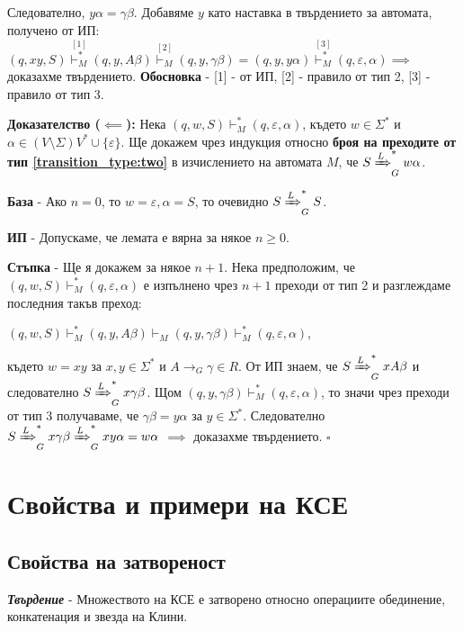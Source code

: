 \documentclass[fleqn,12pt]{article}
\begin{document}
Следователно, $y\alpha = \gamma \beta$. Добавяме $y$ като наставка в твърдението за автомата, получено от ИП:
$(q, xy, S) \overset{[1]}{\vdash_M^*} (q, y, A\beta) \overset{[2]}{\vdash_M} (q, y, \gamma\beta) = (q, y, y \alpha) \overset{[3]}{\vdash_M^*} (q, \varepsilon, \alpha)
\implies$ доказахме твърдението. \textbf{Обосновка} - [1] - от ИП, [2] - правило от тип 2, [3] - правило от тип 3. 

\noindent\textbf{Доказателство ($\impliedby$): } 
Нека $(q, w, S) \vdash_M^* (q, \varepsilon, \alpha)$, където $w \in \Sigma^*$ и $\alpha \in (V \setminus \Sigma)V^* \cup \{\varepsilon\}$.
Ще докажем чрез индукция относно \textbf{броя на преходите от тип \ref{transition_type:two}} в изчислението на автомата $M$, че $S \xRightarrow[]{L}_G^* w\alpha$.

\noindent\textbf{База} - Ако $n = 0$, то $w = \varepsilon, \alpha = S$, то очевидно $S \xRightarrow[]{L}_G^* S$.

\noindent\textbf{ИП} - Допускаме, че лемата е вярна за някое $n \geq 0$.

\noindent\textbf{Стъпка} - Ще я докажем за някое $n + 1$. Нека предположим, че $(q, w, S) \vdash_M^* (q, \varepsilon, \alpha)$ е изпълнено чрез $n+1$ преходи от тип 2 и разглеждаме последния такъв преход:

$(q, w, S) \vdash_M^* (q, y, A\beta) \vdash_M (q, y, \gamma\beta) \vdash_M^* (q, \varepsilon, \alpha)$,

където $w = xy$ за $x, y \in \Sigma^*$ и $A \to_G \gamma \in R$. От ИП знаем, че $S \xRightarrow[]{L}_G^* xA\beta$ и следователно $S \xRightarrow[]{L}_G^* x\gamma\beta$.
Щом $(q, y, \gamma\beta) \vdash_M^* (q, \varepsilon, \alpha)$, то значи чрез преходи от тип 3 получаваме, че $\gamma\beta = y\alpha$ за $y \in \Sigma^*$.
Следователно $S \xRightarrow[]{L}_G^* x\gamma\beta \xRightarrow[]{L}_G^* xy\alpha = w\alpha$
$\implies$ доказахме твърдението.
$\square$

\section{Свойства и примери на КСЕ}

\subsection{Свойства на затвореност}

\noindent\textit{\textbf{Твърдение}} - Множеството на КСЕ е затворено относно операциите обединение, конкатенация и звезда на Клини.
\end{document}
